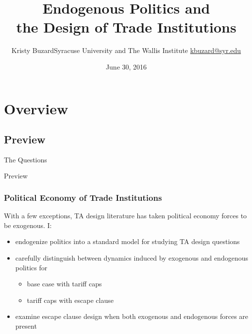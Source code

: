 \documentclass[handout]{beamer}
\title[Endogenous Politics and the Design of Trade Institutions\hspace{2.05in}\insertframenumber/\inserttotalframenumber]{Endogenous Politics and \\ the Design of Trade Institutions}
\author[Kristy Buzard]{\texorpdfstring{Kristy Buzard\newline Syracuse University and The Wallis Institute  \newline\url{kbuzard@syr.edu}}{Kristy Buzard}}
\date{June 30, 2016}
\begin{document}
\maketitle




\section{Overview}
\subsection{Preview}
\begin{frame}{The Questions}

\pause
{}

\end{frame}


\begin{frame}{Preview}
\frametitle{Political Economy of Trade Institutions}
\pause
With a few exceptions, TA design literature has taken political economy forces to be exogenous. I:
\pause
\begin{itemize}[<+->]
	\item endogenize politics into a standard model for studying TA design questions
	\item carefully distinguish between dynamics induced by exogenous and endogenous politics for
		\begin{itemize}[<+->]
			\item base case with tariff caps
			\item tariff caps with escape clause
		\end{itemize}
	\item examine escape clause design when both exogenous and endogenous forces are present
\end{itemize}
\end{frame}
\end{document}
